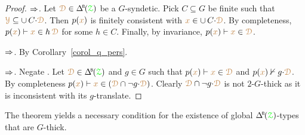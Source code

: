 \begin{proof}
  $\Rightarrow$.
  Let $\mrD\in\BDelta(\grZ)$ be a $G$-syndetic.
  Pick $C\subseteq G$ be finite such that ${\color{brown}\EuScript Y}\subseteq\cup\,C{\cdot}{\color{brown}\EuScript D}$.
  Then $p({\color{brown} x})$ is finitely consistent with ${\color{brown} x}\in\cup\,C{\cdot}{\color{brown}\EuScript D}$.
  By completeness, $p({\color{brown} x})\vdash {\color{brown}x}\in h\,{\color{brown}\EuScript D}$ for some $h\in C$.
  Finally, by invariance, $p({\color{brown} x})\vdash{\color{brown}x}\in{\color{brown}\EuScript D}$.
  
  $\Rightarrow$.
  By Corollary~\ref{corol_q_pers}.

  $\Rightarrow$.
  Negate .
  Let $\mrD\in\BDelta(\grZ)$ and $g\in G$ such that $p({\color{brown} x})\vdash{\color{brown}x}\in{\color{brown}\EuScript D}$ and $p({\color{brown} x})\nvdash g{\cdot}{\color{brown}\EuScript D}$.
  By completeness $p({\color{brown} x})\vdash{\color{brown}x}\in({\color{brown}\EuScript D}\cap\neg g{\cdot}{\color{brown}\EuScript D})$.
  Clearly ${\color{brown}\EuScript D}\cap \neg g{\cdot}{\color{brown}\EuScript D}$ is not $2$-$G$-thick as it is inconsistent with its $g$-translate.
\end{proof}




The theorem yields a necessary condition for the existence of global $\BDelta({\grZ})$-types that are $G$-thick.

